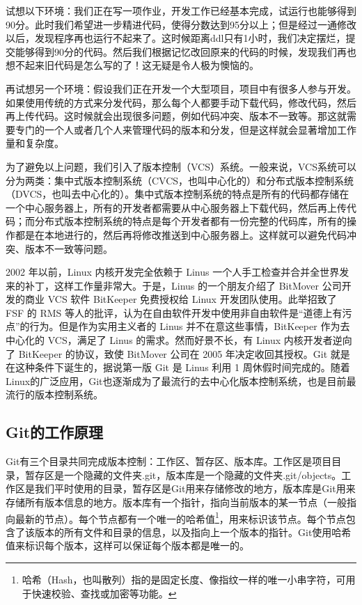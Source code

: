 \documentclass[fontset=none]{ctexart}
\begin{document}
试想以下环境：我们正在写一项作业，开发工作已经基本完成，试运行也能够得到90分。此时我们希望进一步精进代码，使得分数达到95分以上；但是经过一通修改以后，发现程序再也运行不起来了。这时候距离ddl只有1小时，我们决定摆烂，提交能够得到90分的代码。然后我们根据记忆改回原来的代码的时候，发现我们再也想不起来旧代码是怎么写的了！这无疑是令人极为懊恼的。

再试想另一个环境：假设我们正在开发一个大型项目，项目中有很多人参与开发。如果使用传统的方式来分发代码，那么每个人都要手动下载代码，修改代码，然后再上传代码。这时候就会出现很多问题，例如代码冲突、版本不一致等。那这就需要专门的一个人或者几个人来管理代码的版本和分发，但是这样就会显著增加工作量和复杂度。

为了避免以上问题，我们引入了版本控制（VCS）系统。一般来说，VCS系统可以分为两类：集中式版本控制系统（CVCS，也叫中心化的）和分布式版本控制系统（DVCS，也叫去中心化的）。集中式版本控制系统的特点是所有的代码都存储在一个中心服务器上，所有的开发者都需要从中心服务器上下载代码，然后再上传代码；而分布式版本控制系统的特点是每个开发者都有一份完整的代码库，所有的操作都是在本地进行的，然后再将修改推送到中心服务器上。这样就可以避免代码冲突、版本不一致等问题。

2002 年以前，Linux 内核开发完全依赖于 Linus 一个人手工检查并合并全世界发来的补丁，这样工作量非常大。于是，Linus 的一个朋友介绍了 BitMover 公司开发的商业 VCS 软件 BitKeeper 免费授权给 Linux 开发团队使用。此举招致了 FSF 的 RMS 等人的批评，认为在自由软件开发中使用非自由软件是“道德上有污点”的行为。但是作为实用主义者的 Linus 并不在意这些事情，BitKeeper 作为去中心化的 VCS，满足了 Linus 的需求。然而好景不长，有 Linux 内核开发者逆向了 BitKeeper 的协议，致使 BitMover 公司在 2005 年决定收回其授权。Git 就是在这种条件下诞生的，据说第一版 Git 是 Linus 利用 1 周休假时间完成的。随着Linux的广泛应用，Git也逐渐成为了最流行的去中心化版本控制系统，也是目前最流行的版本控制系统。

\subsection{Git的工作原理}

Git有三个目录共同完成版本控制：工作区、暂存区、版本库。工作区是项目目录，暂存区是一个隐藏的文件夹.git，版本库是一个隐藏的文件夹.git/objects。工作区是我们平时使用的目录，暂存区是Git用来存储修改的地方，版本库是Git用来存储所有版本信息的地方。版本库有一个指针，指向当前版本的某一节点（一般指向最新的节点）。每个节点都有一个唯一的哈希值\footnote{哈希（Hash，也叫散列）指的是固定长度、像指纹一样的唯一小串字符，可用于快速校验、查找或加密等功能。}，用来标识该节点。每个节点包含了该版本的所有文件和目录的信息，以及指向上一个版本的指针。Git使用哈希值来标识每个版本，这样可以保证每个版本都是唯一的。
\end{document}
